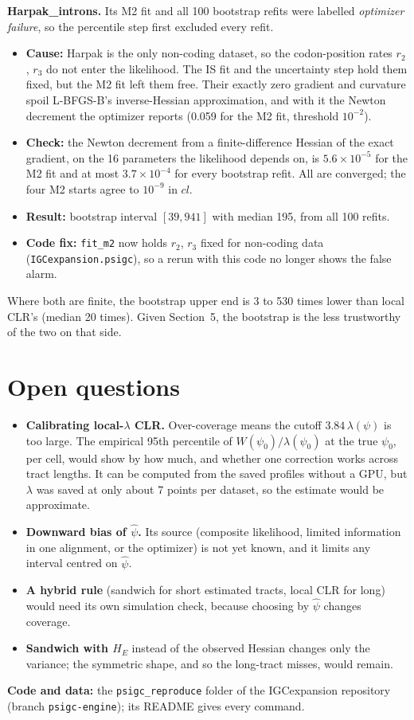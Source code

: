 \documentclass[11pt]{article}
\begin{document}
\textbf{Harpak\_introns.} Its M2 fit and all 100 bootstrap refits were labelled \emph{optimizer failure}, so the percentile step first excluded every refit.
\begin{itemize}
\item \textbf{Cause:} Harpak is the only non-coding dataset, so the codon-position rates $r_2$, $r_3$ do not enter the likelihood. The IS fit and the uncertainty step hold them fixed, but the M2 fit left them free. Their exactly zero gradient and curvature spoil L-BFGS-B's inverse-Hessian approximation, and with it the Newton decrement the optimizer reports (0.059 for the M2 fit, threshold $10^{-2}$).
\item \textbf{Check:} the Newton decrement from a finite-difference Hessian of the exact gradient, on the 16 parameters the likelihood depends on, is $5.6\times10^{-5}$ for the M2 fit and at most $3.7\times10^{-4}$ for every bootstrap refit. All are converged; the four M2 starts agree to $10^{-9}$ in $cl$.
\item \textbf{Result:} bootstrap interval $[39, 941]$ with median 195, from all 100 refits.
\item \textbf{Code fix:} \texttt{fit\_m2} now holds $r_2$, $r_3$ fixed for non-coding data (\texttt{IGCexpansion.psigc}), so a rerun with this code no longer shows the false alarm.
\end{itemize}

Where both are finite, the bootstrap upper end is 3 to 530 times lower than local CLR's (median 20 times). Given Section~5, the bootstrap is the less trustworthy of the two on that side.

\section{Open questions}
\begin{itemize}
\item \textbf{Calibrating local-$\lambda$ CLR.} Over-coverage means the cutoff $3.84\,\lambda(\psi)$ is too large. The empirical 95th percentile of $W(\psi_0)/\lambda(\psi_0)$ at the true $\psi_0$, per cell, would show by how much, and whether one correction works across tract lengths. It can be computed from the saved profiles without a GPU, but $\lambda$ was saved at only about 7 points per dataset, so the estimate would be approximate.
\item \textbf{Downward bias of $\hat\psi$.} Its source (composite likelihood, limited information in one alignment, or the optimizer) is not yet known, and it limits any interval centred on $\hat\psi$.
\item \textbf{A hybrid rule} (sandwich for short estimated tracts, local CLR for long) would need its own simulation check, because choosing by $\hat\psi$ changes coverage.
\item \textbf{Sandwich with $H_E$} instead of the observed Hessian changes only the variance; the symmetric shape, and so the long-tract misses, would remain.
\end{itemize}

\textbf{Code and data:} the \texttt{psigc\_reproduce} folder of the IGCexpansion repository (branch \texttt{psigc-engine}); its README gives every command.
\end{document}
